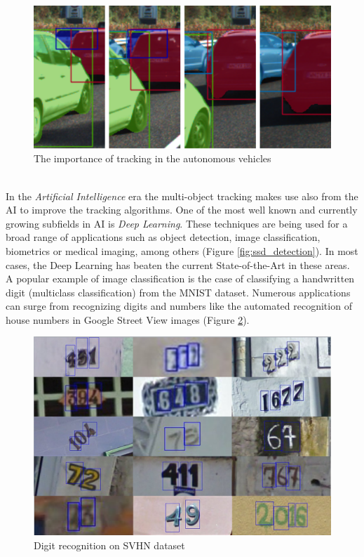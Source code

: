 \begin{figure}[h!]
\begin{center}
\includegraphics[scale=0.4]{figures/adas_tracking.png}
\caption{The importance of tracking in the autonomous vehicles \cite{voigtlaender2019mots}}
\label{fig:adas_tracking}
\end{center}
\end{figure}\\
In the \textit{Artificial Intelligence} era the multi-object tracking makes use also from the AI to improve the tracking algorithms. One of the most well known and currently growing subfields in AI is \textit{Deep Learning}. These techniques are being used for a broad range of applications such as object detection, image classification, biometrics or medical imaging, among others (Figure \ref{fig:ssd_detection}). In most cases, the Deep Learning has beaten the current State-of-the-Art in these areas.\\
A popular example of image classification is the case of classifying a handwritten digit (multiclass classification) from the MNIST dataset. Numerous applications can surge from recognizing digits and numbers like the automated recognition of house numbers in Google Street View images (Figure \ref{svhn}).
\begin{figure}[H]
\begin{center}
\includegraphics[scale=0.3]{figures/svhn.png}
\caption{Digit recognition on SVHN dataset \cite{netzer2011reading}}
\label{svhn}
\end{center}
\end{figure}
